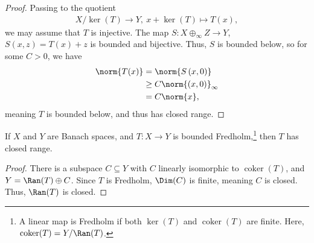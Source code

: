 \documentclass[10pt]{mypackage}
\begin{document}
  \begin{proof}
    Passing to the quotient
    \begin{align*}
      X/\ker(T) \rightarrow Y,~x + \ker(T) \mapsto T(x),
    \end{align*}
    we may assume that $T$ is injective. The map $S: X\oplus_{\infty}Z \rightarrow Y$, $S(x,z) = T(x) + z$ is bounded and bijective. Thus, $S$ is bounded below, so for some $C > 0$, we have
    \begin{align*}
      \norm{T(x)} &= \norm{S\left(x,0\right)}\\
                  &\geq C\norm{\left(x,0\right)}_{\infty}\\
                  &= C\norm{x},
    \end{align*}
    meaning $T$ is bounded below, and thus has closed range.
  \end{proof}
  \begin{corollary}
    If $X$ and $Y$ are Banach spaces, and $T: X\rightarrow Y$ is bounded Fredholm,\footnote{A linear map is Fredholm if both $\ker(T)$ and $\operatorname{coker}(T) $ are finite. Here, $\operatorname{coker}(T) = Y/\Ran(T)$.} then $T$ has closed range.
  \end{corollary}
  \begin{proof}
    There is a subspace $C\subseteq Y$ with $C$ linearly isomorphic to $\operatorname{coker}(T)$, and $Y = \Ran(T)\oplus C$. Since $T$ is Fredholm, $\Dim(C)$ is finite, meaning $C$ is closed. Thus, $\Ran(T)$ is closed.
  \end{proof}
\end{document}
